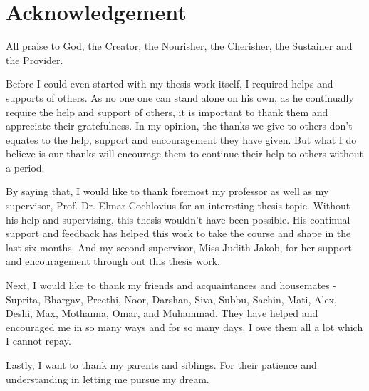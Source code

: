 \chapter*{Acknowledgement}

All praise to God, the Creator, the Nourisher, the Cherisher, the Sustainer and the Provider.

Before I could even started with my thesis work itself, I required helps and supports of others. As no one one can stand alone on his own, as he continually require the help and support of others, it is important to thank them and appreciate their gratefulness. In my opinion, the thanks we give to others don't equates to the help, support and encouragement they have given. But what I do believe is our thanks will encourage them to continue their help to others without a period.

By saying that, I would like to thank foremost my professor as well as my supervisor, Prof. Dr. Elmar Cochlovius for an interesting thesis topic. Without his help and supervising, this thesis wouldn't have been possible. His continual support and feedback has helped this work to take the course and shape in the last six months. And my second supervisor, Miss Judith Jakob, for her support and encouragement through out this thesis work.

Next, I would like to thank my friends and acquaintances and housemates - Suprita, Bhargav, Preethi, Noor, Darshan, Siva, Subbu, Sachin, Mati, Alex, Deshi, Max, Mothanna, Omar, and Muhammad. They have helped and encouraged me in so many ways and for so many days. I owe them all a lot which I cannot repay. 

Lastly, I want to thank my parents and siblings. For their patience and understanding in letting me pursue my dream.